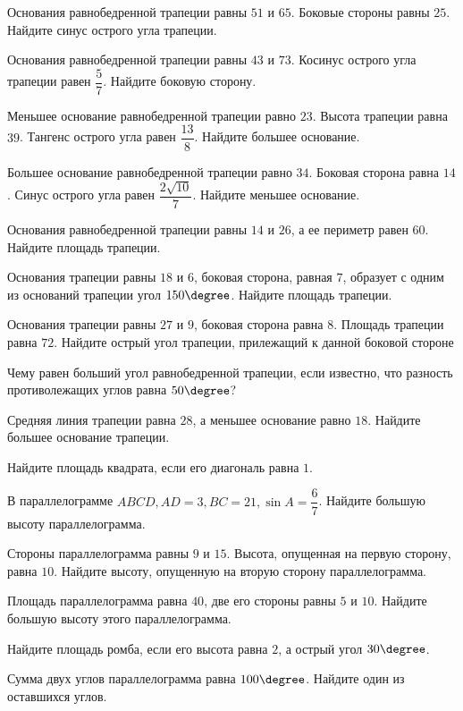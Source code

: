 \begin{class}[number=7]
	\begin{listofex}
		\item Основания равнобедренной трапеции равны \(51\) и \(65\). Боковые стороны равны \(25\). Найдите синус острого угла трапеции.
		\item Основания равнобедренной трапеции равны \(43\) и \(73\). Косинус острого угла трапеции равен \(\dfrac{5}{7}\).  Найдите боковую сторону.
		\item Меньшее основание равнобедренной трапеции равно \(23\). Высота трапеции равна \(39\). Тангенс острого угла равен \(\dfrac{13}{8}\).  Найдите большее основание.
		\item Большее основание равнобедренной трапеции равно \(34\). Боковая сторона равна \(14\). Синус острого угла равен \( \dfrac{2\sqrt{10}}{7} \).  Найдите меньшее основание.
		\item Основания равнобедренной трапеции равны \(14\) и \(26\), а ее периметр равен \(60\). Найдите площадь трапеции.
		\item Основания трапеции равны \(18\) и \(6\), боковая сторона, равная \(7\), образует с одним из оснований трапеции угол \(150 \degree \). Найдите площадь трапеции.
		\item Основания трапеции равны \(27\) и \(9\), боковая сторона равна \(8\). Площадь трапеции равна \(72\). Найдите острый угол трапеции, прилежащий к данной боковой стороне
		\item Чему равен больший угол равнобедренной трапеции, если известно, что разность противолежащих углов равна \(50 \degree \)? 
		\item Средняя линия трапеции равна \(28\), а меньшее основание равно \(18\). Найдите большее основание трапеции.
		
		\item Найдите площадь квадрата, если его диагональ равна \(1\).
		\item В параллелограмме \(ABCD, AD = 3, BC=21,  \sin A= \dfrac{6}{7}\).  Найдите большую высоту параллелограмма.
		\item Стороны параллелограмма равны \(9\) и \(15\). Высота, опущенная на первую сторону, равна \(10\). Найдите высоту, опущенную на вторую сторону параллелограмма.
		\item Площадь параллелограмма равна \(40\), две его стороны равны \(5\) и \(10\). Найдите большую высоту этого параллелограмма.
		\item Найдите площадь ромба, если его высота равна \(2\), а острый угол \(30 \degree \).
		\item Сумма двух углов параллелограмма равна \(100\degree \). Найдите один из оставшихся углов.
		

\end{listofex}
\end{class}
